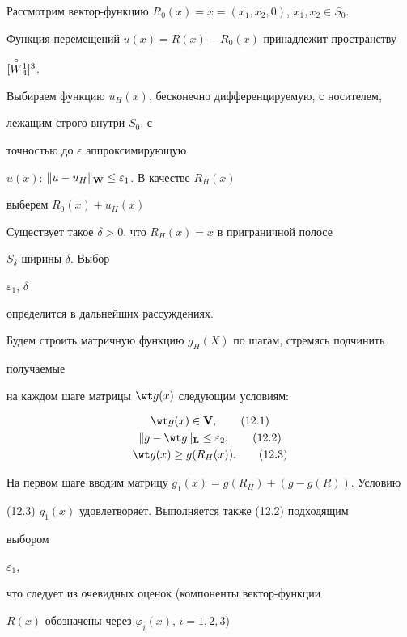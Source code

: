 \begin{pf}


Рассмотрим вектор-функцию $R_0(x)=x=(x_1,x_2,0)$, $x_1,x_2\in S_0$.


Функция перемещений $u(x)=R(x)-R_0(x)$ принадлежит пространству


$[\overset{\circ}{W}{}^1_4]^3$.


Выбираем функцию $u_H(x)$, бесконечно дифференцируемую, с носителем,


лежащим строго внутри $S_0$, с


точностью до $\varepsilon$ аппроксимирующую


$u(x)$: $\|u-u_H\|_{\bold W}\le\varepsilon_1$. В качестве $R_H(x)$


выберем $R_0(x)+u_H(x)$


Существует такое $\delta>0$, что $R_H(x)=x$ в приграничной полосе


$S_\delta$ ширины $\delta$. Выбор


$\varepsilon_1$, $\delta$


определится в дальнейших рассуждениях.





Будем строить матричную функцию $g_H(X)$ по шагам, стремясь подчинить


получаемые


на каждом шаге матрицы $\wt g(x)$ следующим условиям:


\begin{gather}


\wt g(x)\in\bold V,\tag{12.1}\\


\|g-\wt g\|_{\bold L}\le\varepsilon_2,\tag{12.2}\\


\wt g(x)\ge g(R_H(x)).\tag{12.3}


\end{gather}


\addtocounter{equation}{1}


На первом шаге вводим матрицу $g_1(x)=g(R_H)+(g-g(R))$. Условию


(12.3) $g_1(x)$ удовлетворяет. Выполняется также (12.2) подходящим


выбором


$\varepsilon_1$,


что следует из очевидных оценок (компоненты вектор-функции


$R(x)$ обозначены через $\varphi_i(x)$, $i=1,2,3$)


\begin{multline*}



\end{multline*}
\end{pf}
